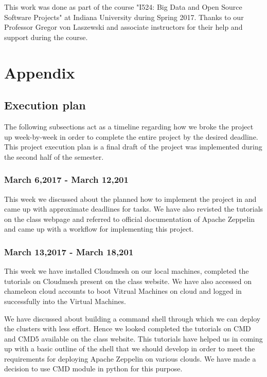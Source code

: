 \documentclass[9pt,twocolumn,twoside]{../../styles/osajnl}
\begin{document}
	This work was done as part of the course "I524: Big Data and
	Open Source Software Projects" at Indiana University during
	Spring 2017. Thanks to our Professor Gregor von Laszewski
	and associate instructors for their help and support during the
	course.
	
	
	
	
	
	\appendix
	
	\section{Appendix}
	\subsection{Execution plan}
	
	The following subsections act as a timeline regarding how we 
	broke 
	the project up week-by-week in order to complete the entire 
	project 
	by the desired deadline. This project execution plan is a final 
	draft 
	of the project was implemented during the second half of the 
	semester.
	
	\subsubsection{March 6,2017 - March 12,201}
	
	This week we discussed about the planned how to implement the 
	project 
	in and came up with approximate deadlines for tasks. We have also 
	revisted the tutorials on the class webpage and referred to 
	official 
	documentation of Apache Zeppelin and came up with a workflow for 
	implementing this project.
	
	\subsubsection{March 13,2017 - March 18,201}
	
	This week we have installed Cloudmesh on our local machines, 
	completed the tutorials on Cloudmesh present on the class 
	website. We 
	have also accessed on chameleon cloud accounts to boot Vitrual 
	Machines on cloud and logged in successfully into the Virtual 
	Machines.
	
	We have discussed about building a command shell through which 
	we can deploy the clusters with less effort. Hence we looked 
	completed the tutorials on CMD and CMD5 available on the class 
	website. This tutorials have helped us in coming up with a basic 
	outline of the shell that we should develop in order to meet the 
	requirements for deploying Apache Zeppelin on various clouds. We 
	have 
	made a decision to use CMD module in python for this purpose.
	
\end{document}
